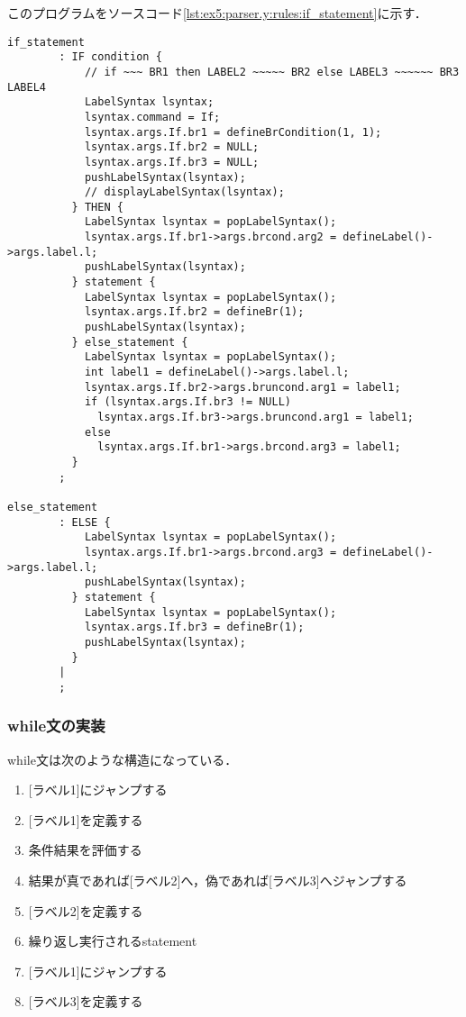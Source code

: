 \documentclass[uplatex]{jsarticle}
\begin{document}
このプログラムをソースコード\ref{lst:ex5:parser.y:rules:if_statement}に示す．
\begin{lstlisting}[caption=if文の処理,label=lst:ex5:parser.y:rules:if_statement]
if_statement
        : IF condition {
            // if ~~~ BR1 then LABEL2 ~~~~~ BR2 else LABEL3 ~~~~~~ BR3 LABEL4
            LabelSyntax lsyntax;
            lsyntax.command = If;
            lsyntax.args.If.br1 = defineBrCondition(1, 1);
            lsyntax.args.If.br2 = NULL;
            lsyntax.args.If.br3 = NULL;
            pushLabelSyntax(lsyntax);
            // displayLabelSyntax(lsyntax);
          } THEN {
            LabelSyntax lsyntax = popLabelSyntax();
            lsyntax.args.If.br1->args.brcond.arg2 = defineLabel()->args.label.l;
            pushLabelSyntax(lsyntax);
          } statement {
            LabelSyntax lsyntax = popLabelSyntax();
            lsyntax.args.If.br2 = defineBr(1);
            pushLabelSyntax(lsyntax);
          } else_statement {
            LabelSyntax lsyntax = popLabelSyntax();
            int label1 = defineLabel()->args.label.l;
            lsyntax.args.If.br2->args.bruncond.arg1 = label1;
            if (lsyntax.args.If.br3 != NULL)
              lsyntax.args.If.br3->args.bruncond.arg1 = label1;
            else
              lsyntax.args.If.br1->args.brcond.arg3 = label1;
          }
        ;

else_statement
        : ELSE {
            LabelSyntax lsyntax = popLabelSyntax();
            lsyntax.args.If.br1->args.brcond.arg3 = defineLabel()->args.label.l;
            pushLabelSyntax(lsyntax);
          } statement {
            LabelSyntax lsyntax = popLabelSyntax();
            lsyntax.args.If.br3 = defineBr(1);
            pushLabelSyntax(lsyntax);
          }
        |
        ;
\end{lstlisting}
\subsubsection{while文の実装}

while文は次のような構造になっている．
\begin{enumerate}
  \item {[ラベル1]にジャンプする}
  \item {[ラベル1]を定義する}
  \item {条件結果を評価する}
  \item {結果が真であれば[ラベル2]へ，偽であれば[ラベル3]へジャンプする}
  \item {[ラベル2]を定義する}
  \item {繰り返し実行されるstatement}
  \item {[ラベル1]にジャンプする}
  \item {[ラベル3]を定義する}
\end{enumerate}
\end{document}
